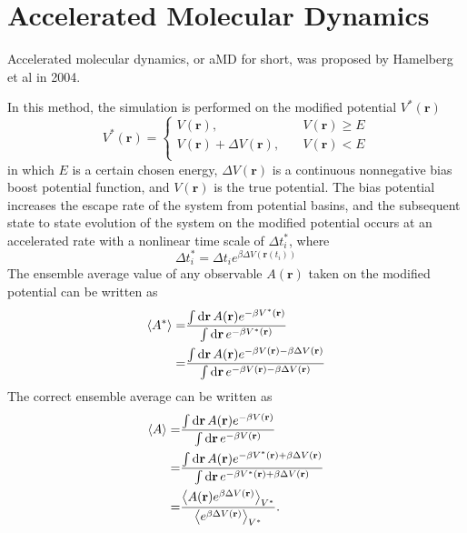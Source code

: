 \section{Accelerated Molecular Dynamics\label{Sec:ES:aMD}}
Accelerated molecular dynamics, or aMD for short, was proposed by Hamelberg et al in 2004.\cite{HamelbergJCP2004}

In this method, the simulation is performed on the modified potential $V^\ast(\mathbf{r})$
\begin{equation}
	V^\ast(\mathbf{r})= 
	\left\{ 
	\begin{array}{rl} 
		V(\mathbf{r}), &\quad V(\mathbf{r})\geq E\\ 
		V(\mathbf{r})+\Delta V(\mathbf{r}), &\quad V(\mathbf{r})< E\\  
	\end{array} 
	\right.
\end{equation}
in which $E$ is a certain chosen energy, $\Delta V(\mathbf{r})$ is a continuous nonnegative bias boost potential function, and $V(\mathbf{r})$ is the true potential. The bias potential increases the escape rate of the system from potential basins, and the subsequent state to state evolution of the system on the modified potential occurs at an accelerated rate with a nonlinear time scale of $\Delta t^\ast_i$, where
\begin{equation}
	\Delta t^\ast_i=\Delta t_i e^{\beta \Delta V(\mathbf{r}(t_i))}
\end{equation}
The ensemble average value of any observable $A(\mathbf{r})$ taken on the modified potential can be written as
\begin{align}
	\left<A^\ast\right>=&\frac{\int \mathop{}\!\mathrm{d} \mathbf{r}\,A(\mathbf{r})e^{-\beta V^{\ast}(\mathbf{r})}}{\int \mathop{}\!\mathrm{d} \mathbf{r}\, e^{-\beta V^{\ast}(\mathbf{r})}}\notag\\
	        =&\frac{\int \mathop{}\!\mathrm{d} \mathbf{r}\,A(\mathbf{r})e^{-\beta V(\mathbf{r})-\beta \Delta V(\mathbf{r})}}{\int \mathop{}\!\mathrm{d} \mathbf{r}\, e^{-\beta V(\mathbf{r})-\beta \Delta V(\mathbf{r})}}
\end{align}
The correct ensemble average can be written as
\begin{align}
	\left<A\right>=&\frac{\int \mathop{}\!\mathrm{d} \mathbf{r}\,A(\mathbf{r})e^{-\beta V(\mathbf{r})}}{\int \mathop{}\!\mathrm{d} \mathbf{r}\, e^{-\beta V(\mathbf{r})}}\notag\\
	=&\frac{\int \mathop{}\!\mathrm{d} \mathbf{r}\,A(\mathbf{r})e^{-\beta V^\ast(\mathbf{r})+\beta \Delta V(\mathbf{r})}}{\int \mathop{}\!\mathrm{d} \mathbf{r}\, e^{-\beta V^\ast(\mathbf{r})+\beta \Delta V(\mathbf{r})}}\notag\\
	=&\frac{\left<A(\mathbf{r})e^{\beta \Delta V(\mathbf{r})}\right>_{V^\ast}}{\left<e^{\beta \Delta V(\mathbf{r}) }\right>_{V^\ast}}.
\end{align}
